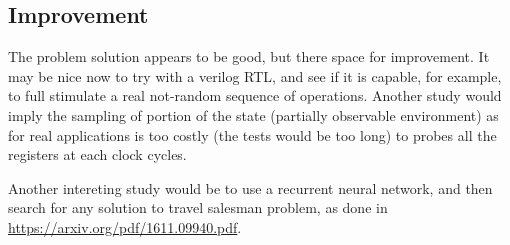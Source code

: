 \documentclass{article}
\begin{document}
\subsection{Improvement}
% 
% 
% 
% 
% 
% 

The problem solution appears to be good, but there space for improvement. It may be nice now to try with a verilog RTL, and see if it is capable, for example, to full stimulate a real not-random sequence of operations. Another study would imply the sampling of portion of the state (partially observable environment) as for real applications is too costly (the tests would be too long) to probes all the registers at each clock cycles.

Another intereting study would be to use a recurrent neural network, and then search for any solution to travel salesman problem, as done in \href{this paper}{https://arxiv.org/pdf/1611.09940.pdf}. 
\end{document}
